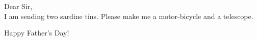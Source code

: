 \documentclass[12 pt]{article}
\begin{document}
\begin{frontcover}
Dear Sir,\\
I am sending two sardine tins.  Please make me a motor-bicycle and a telescope.
\end{frontcover}

\begin{insideright}
Happy
Father's Day!
\end{insideright}
\end{document}
